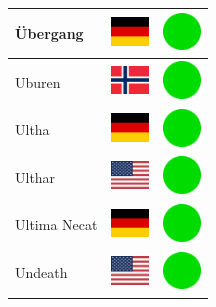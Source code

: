 \documentclass[12pt, a4paper, twoside]{report}
\begin{document}
\begin{center}
\begin{longtable}{|p{5cm}|p{2cm}|p{2cm}|}
 Übergang                                                   & \includegraphics[width=1cm]{../img/flags/de} &   \includegraphics[width=1cm]{../likes/y} \\ \hline
 Uburen                                                     & \includegraphics[width=1cm]{../img/flags/no} &   \includegraphics[width=1cm]{../likes/y} \\ \hline
 Ultha                                                      & \includegraphics[width=1cm]{../img/flags/de} &   \includegraphics[width=1cm]{../likes/y} \\ \hline
 Ulthar                                                     & \includegraphics[width=1cm]{../img/flags/us} &   \includegraphics[width=1cm]{../likes/y} \\ \hline
 Ultima Necat                                               & \includegraphics[width=1cm]{../img/flags/de} &   \includegraphics[width=1cm]{../likes/y} \\ \hline
 Undeath                                                    & \includegraphics[width=1cm]{../img/flags/us} &   \includegraphics[width=1cm]{../likes/y} \\ \hline

\end{longtable}
\end{center}
\end{document}
